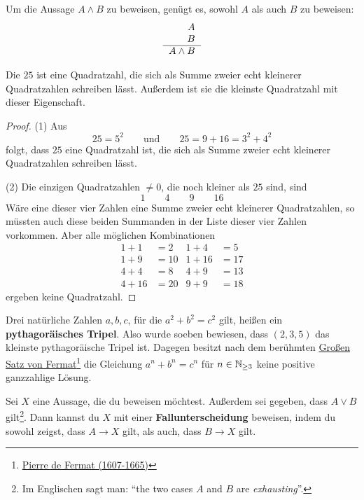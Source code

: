 \begin{axiom} \label{undbeweise}
    Um die Aussage $A\land B$ zu beweisen, genügt es, sowohl $A$ als auch $B$ zu beweisen:
    \[\begin{tabular}{r}
        $A$ \\
        $B$ \\
        \hline 
        $A\land B$
    \end{tabular} \]
\end{axiom}


\begin{bsp}[*]
    Die $25$ ist eine Quadratzahl, die sich als Summe zweier echt kleinerer Quadratzahlen schreiben lässt. Außerdem ist sie die kleinste Quadratzahl mit dieser Eigenschaft.
\end{bsp}
\begin{proof}
    (1) Aus
        \[ 25=5^2 \qquad\text{und}\qquad 25 = 9 + 16 = 3^2 + 4^2 \]
    folgt, dass $25$ eine Quadratzahl ist, die sich als Summe zweier echt kleinerer Quadratzahlen schreiben lässt.
    
    (2) Die einzigen Quadratzahlen $\neq 0$, die noch kleiner als $25$ sind, sind
        \[ 1\qquad 4\qquad 9\qquad 16 \]
    Wäre eine dieser vier Zahlen eine Summe zweier echt kleinerer Quadratzahlen, so müssten auch diese beiden Summanden in der Liste dieser vier Zahlen vorkommen. Aber alle möglichen Kombinationen
    \begin{align*}
        1+1 & = 2 & 1+4 & = 5 \\
        1+ 9 & = 10 & 1+16 & = 17 \\
        4 + 4 & = 8 & 4+9 & = 13 \\
        4+16 & = 20 & 9+9 & = 18
    \end{align*}
    ergeben keine Quadratzahl.
\end{proof}


\begin{bem}[*]
    Drei natürliche Zahlen $a,b,c$, für die $a^2+b^2=c^2$ gilt, heißen ein \textbf{pythagoräisches Tripel}. Also wurde soeben bewiesen, dass $(2,3,5)$ das kleinste pythagoräische Tripel ist. Dagegen besitzt nach dem berühmten \href{https://de.wikipedia.org/wiki/Gro\%C3\%9Fer_Fermatscher_Satz}{Großen Satz von Fermat}\footnote{\href{https://de.wikipedia.org/wiki/Pierre_de_Fermat}{Pierre de Fermat (1607-1665)}} die Gleichung $a^n+b^n=c^n$ für $n\in \mathbb N_{\ge 3}$ keine positive ganzzahlige Lösung.
\end{bem}


\begin{axiom} \label{fallunterscheidung} 
    Sei $X$ eine Aussage, die du beweisen möchtest. Außerdem sei gegeben, dass $A\lor B$ gilt\footnote{Im Englischen sagt man: ``the two cases $A$ and $B$ are \emph{exhausting}''.}. Dann kannst du $X$ mit einer \textbf{Fallunterscheidung} beweisen, indem du sowohl zeigst, dass $A\to X$ gilt, als auch, dass $B\to X$ gilt.
\end{axiom}


